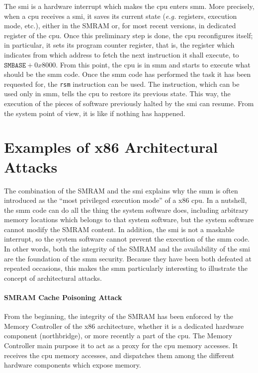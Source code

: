 The \ac{smi} is a hardware interrupt which makes the \ac{cpu} enters \ac{smm}.
%
More precisely, when a \ac{cpu} receives a \ac{smi}, it saves its current state
(\emph{e.g.} registers, execution mode, etc.), either in the SMRAM or, for most
recent versions, in dedicated register of the \ac{cpu}.
%
Once this preliminary step is done, the \ac{cpu} reconfigures itself;
%
in particular, it sets its program counter register, that is, the register which
indicates from which address to fetch the next instruction it shall execute, to
$\texttt{SMBASE} + 0x8000$.
%
From this point, the \ac{cpu} is in \ac{smm} and starts to execute what should
be the \ac{smm} code.
%
Once the \ac{smm} code has performed the task it has been requested for, the
\texttt{rsm} instruction can be used.
%
The instruction, which can be used only in \ac{smm}, tells the \ac{cpu} to
restore its previous state.
%
This way, the execution of the pieces of software previously halted by the
\ac{smi} can resume.
%
From the system point of view, it is like if nothing has happened.

\section{Examples of x86 Architectural Attacks}
\label{sec:usecase:hse}

The combination of the SMRAM and the \ac{smi} explains why the \ac{smm} is often
introduced as the ``most privileged execution mode'' of a x86 \ac{cpu}.
%
In a nutshell, the \ac{smm} code can do all the thing the system software does,
including arbitrary memory locations which belongs to that system software, but
the system software cannot modify the SMRAM content.
%
In addition, the \ac{smi} is not a maskable interrupt, so the system software
cannot prevent the execution of the \ac{smm} code.
%
In other words, both the integrity of the SMRAM and the availability of the
\ac{smi} are the foundation of the \ac{smm} security.
%
Because they have been both defeated at repeated occasions, this makes the
\ac{smm} particularly interesting to illustrate the concept of architectural
attacks.

\paragraph{SMRAM Cache Poisoning Attack}
%
From the beginning, the integrity of the SMRAM has been enforced by the Memory
Controller of the x86 architecture, whether it is a dedicated hardware component
(northbridge), or more recently a part of the \ac{cpu}.
%
The Memory Controller main purpose it to act as a proxy for the \ac{cpu} memory
accesses.
%
It receives the \ac{cpu} memory accesses, and dispatches them among the
different hardware components which expose memory.

